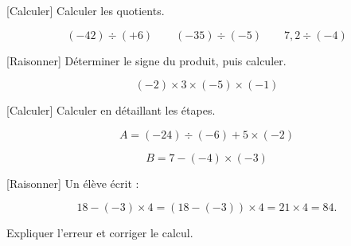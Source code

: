 \documentclass[12pt,a4paper]{article}
\begin{document}

[Calculer]
Calculer les quotients. 

\[
(-42)\div(+6)
\qquad
(-35)\div(-5)
\qquad
7{,}2\div(-4)
\]


[Raisonner]
Déterminer le signe du produit, puis calculer. 

\[
(-2)\times3\times(-5)\times(-1)
\]


[Calculer]
Calculer en détaillant les étapes. 

\[
A=(-24)\div(-6)+5\times(-2)
\]

\[
B=7-(-4)\times(-3)
\]


[Raisonner]
Un élève écrit :

\[
18-(-3)\times4=(18-(-3))\times4=21\times4=84.
\]

Expliquer l'erreur et corriger le calcul. 

\end{document}
